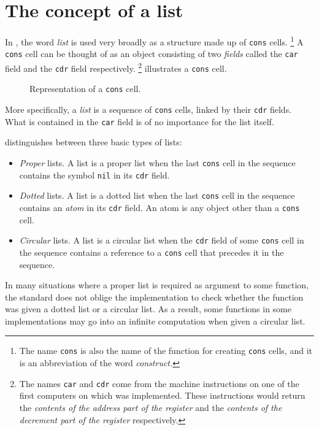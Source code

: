 \chapter{The concept of a list}
\label{chap-list-concept}

In \commonlisp{}, the word \emph{list} is used very broadly as a structure
made up of \texttt{cons} cells.%
\footnote{The name \texttt{cons} is also the name of the function for
  creating \texttt{cons} cells, and it is an abbreviation of the word
  \emph{construct.}}  A \texttt{cons} cell can be thought of as an
object consisting of two \emph{fields} called the \texttt{car} field
and the \texttt{cdr} field respectively.%
\footnote{The names \texttt{car} and \texttt{cdr} come from the
  machine instructions on one of the first computers on which \lisp{}
  was implemented.  These instructions would return the \emph{contents
    of the address part of the register} and the \emph{contents of the
    decrement part of the register} respectively.}
 illustrates a \texttt{cons} cell.

\begin{figure}
\begin{center}
\end{center}
\caption{\label{fig-cons-cell}
Representation of a \texttt{cons} cell.}
\end{figure}

More specifically, a \emph{list} is a sequence of \texttt{cons} cells,
linked by their \texttt{cdr} fields.  What is contained in the
\texttt{car} field is of no importance for the list itself.

\commonlisp{} distinguishes between three basic types of lists:

\begin{itemize}
\item \emph{Proper} lists.  A list is a proper list when the last
  \texttt{cons} cell in the sequence contains the symbol \texttt{nil}
  in its \texttt{cdr} field. 
\item \emph{Dotted} lists.  A list is a dotted list when the last
  \texttt{cons} cell in the sequence contains an \emph{atom}
  in its \texttt{cdr} field.  An atom is any \commonlisp{} object other than a
  \texttt{cons} cell.
\item \emph{Circular} lists.  A list is a circular list when the
  \texttt{cdr} field of some \texttt{cons} cell in the sequence
  contains a reference to a \texttt{cons} cell that precedes it in the
  sequence. 
\end{itemize}

In many situations where a proper list is required as argument to some
function, the \commonlisp{} standard does not oblige the implementation to
check whether the function was given a dotted list or a circular
list.  As a result, some functions in some implementations may go into
an infinite computation when given a circular list.
